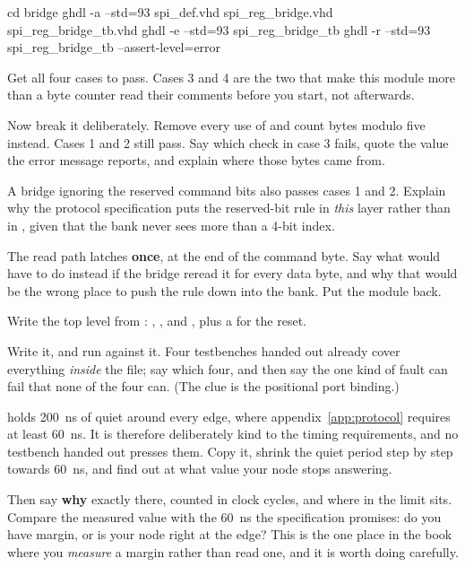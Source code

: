 \begin{shell}
cd bridge
ghdl -a --std=93 spi_def.vhd spi_reg_bridge.vhd spi_reg_bridge_tb.vhd
ghdl -e --std=93 spi_reg_bridge_tb
ghdl -r --std=93 spi_reg_bridge_tb --assert-level=error
\end{shell}

 Get all four cases to pass. Cases 3 and 4 are the two that make this module more than a
byte counter \textemdash{} read their comments before you start, not afterwards.

 Now break it deliberately. Remove every use of  and count bytes modulo five
instead. Cases 1 and 2 still pass. Say which check in case 3 fails, quote the value the error message
reports, and explain where those bytes came from.

 A bridge ignoring the reserved command bits also passes cases 1 and 2. Explain why the
protocol specification puts the reserved-bit rule in \emph{this} layer rather than in
, given that the bank never sees more than a 4-bit index.

 The read path latches  \textbf{once}, at the end of the command byte. Say
what  would have to do instead if the bridge reread it for every data byte, and
why that would be the wrong place to push the rule down into the bank. Put the module back.

\label{c19:ex:node}
Write the top level from : , ,
 and , plus a  for the reset.

 Write it, and run  against it. Four testbenches handed out already
cover everything \emph{inside} the file; say which four, and then say the one kind of fault
 can fail that none of the four can. (The clue is the positional port binding.)

  holds 200~ns of quiet around every  edge, where
appendix~\ref{app:protocol} requires at least 60~ns. It is therefore deliberately kind to the timing
requirements, and no testbench handed out presses them. Copy it, shrink the quiet period step by step
towards 60~ns, and find out at what value your node stops answering.

Then say \textbf{why} exactly there, counted in clock cycles, and where in  the limit
sits. Compare the measured value with the 60~ns the specification promises: do you have margin, or is
your node right at the edge? This is the one place in the book where you \emph{measure} a margin
rather than read one, and it is worth doing carefully.

